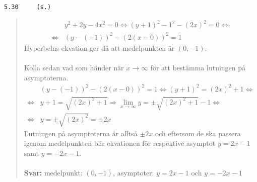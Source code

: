 \documentclass[a4paper]{article}
\newcommand{\tskcol}[1]{\textcolor{tskcol}{#1}}
\begin{document}
	\texttt{\tskcol{5.30~~~~ (s.)}}
	\begin{quotation}
		\noindent
		\begin{align*}
		&y^2+2y-4x^2=0 \Leftrightarrow
		(y+1)^2-1^2-(2x)^2=0 \Leftrightarrow \\ \Leftrightarrow
		&(y-(-1))^2-(2(x-0))^2=1
		\end{align*}
		Hyperbelns ekvation ger då att medelpunkten är $(0,-1)$.
		\\ \\
		Kolla sedan vad som händer när $x\rightarrow\infty$ för att bestämma lutningen på asymptoterna.
		\begin{align*}
		&(y-(-1))^2-(2(x-0))^2=1 \Leftrightarrow
		(y+1)^2=(2x)^2+1 \Leftrightarrow \\ \Leftrightarrow
		&y+1=\sqrt{(2x)^2+1} \Rightarrow
		\lim_{x\rightarrow\infty}y=\pm\sqrt{(2x)^2+1}-1 \Leftrightarrow \\ \Leftrightarrow
		&y=\pm\sqrt{(2x)^2}=\pm2x
		\end{align*}
		Lutningen på asymptoterna är alltså $\pm2x$ och eftersom de ska passera igenom medelpunkten blir ekvationen för respektive asymptot $y=2x-1$ samt $y=-2x-1$.
		\\ \\
		\textbf{Svar:} medelpunkt: $(0,-1)$, asymptoter: $y=2x-1$ och $y=-2x-1$
	\end{quotation}
	
\end{document}
